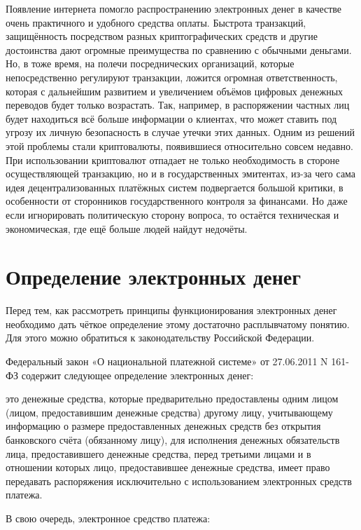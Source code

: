 \documentclass[12pt,a4paper]{article}
\begin{document}
Появление интернета помогло распространению электронных денег в качестве очень практичного и удобного средства оплаты. Быстрота транзакций, защищённость посредством разных криптографических средств и другие достоинства дают огромные преимущества по сравнению с обычными деньгами. Но, в тоже время, на полечи посреднических организаций, которые непосредственно регулируют транзакции, ложится огромная ответственность, которая с дальнейшим развитием и увеличением объёмов цифровых денежных переводов будет только возрастать. Так, например, в распоряжении частных лиц будет находиться всё больше информации о клиентах, что может ставить под угрозу их личную безопасность в случае утечки этих данных. Одним из решений этой проблемы стали криптовалюты, появившиеся относительно совсем недавно. При использовании криптовалют отпадает не только необходимость в стороне осуществляющей транзакцию, но и в государственных эмитентах, из-за чего сама идея децентрализованных платёжных систем подвергается большой критики, в особенности от сторонников государственного контроля за финансами. Но даже если игнорировать политическую сторону вопроса, то остаётся техническая и экономическая, где ещё больше людей найдут недочёты.

\section{Определение электронных денег}

Перед тем, как рассмотреть принципы функционирования электронных денег необходимо дать чёткое определение этому достаточно расплывчатому понятию. Для этого можно обратиться к законодательству Российской Федерации.

Федеральный закон «О национальной платежной системе» от 27.06.2011 N 161-ФЗ содержит следующее определение электронных денег:

\begin{displayquote}
	это денежные средства, которые предварительно предоставлены одним лицом (лицом, предоставившим денежные средства) другому лицу, учитывающему информацию о размере предоставленных денежных средств без открытия банковского счёта (обязанному лицу), для исполнения денежных обязательств лица, предоставившего денежные средства, перед третьими лицами и в отношении которых лицо, предоставившее денежные средства, имеет право передавать распоряжения исключительно с использованием электронных средств платежа.
\end{displayquote}

В свою очередь, электронное средство платежа:
\end{document}
